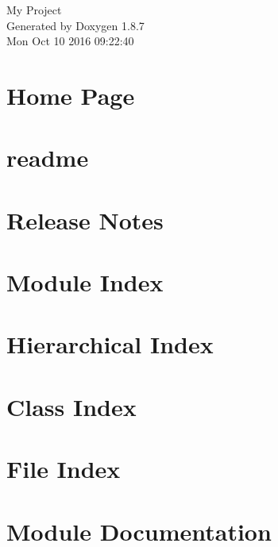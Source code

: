 \documentclass[twoside]{book}
\newcommand{\+}{\discretionary{\mbox{\scriptsize$\hookleftarrow$}}{}{}}
\newcommand{\clearemptydoublepage}{%
  \newpage{\pagestyle{empty}\cleardoublepage}%
}
\begin{document}
\hypersetup{pageanchor=false,
             bookmarks=true,
             bookmarksnumbered=true,
             pdfencoding=unicode
            }
\begin{titlepage}
\vspace*{7cm}
\begin{center}%
{\Large My Project }\\
\vspace*{1cm}
{\large Generated by Doxygen 1.8.7}\\
\vspace*{0.5cm}
{\small Mon Oct 10 2016 09:22:40}\\
\end{center}
\end{titlepage}
\clearemptydoublepage
\tableofcontents
\clearemptydoublepage
{}
\hypersetup{pageanchor=true}

\chapter{Home Page}
\label{index}\hypertarget{index}{}
\chapter{readme}
\label{md_readme}
\hypertarget{md_readme}{}

\chapter{Release Notes}
\label{md_release_notes}
\hypertarget{md_release_notes}{}

\chapter{Module Index}

\chapter{Hierarchical Index}

\chapter{Class Index}

\chapter{File Index}

\chapter{Module Documentation}





\end{document}
